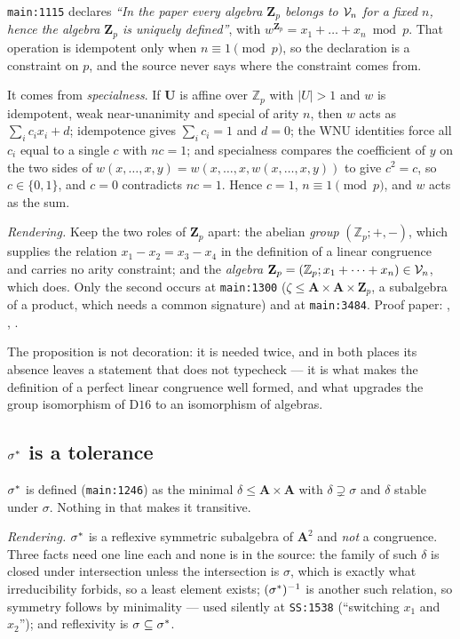 \texttt{main:1115} declares \emph{``In the paper every algebra $\mathbf Z_{p}$
belongs to $\mathcal V_{n}$ for a fixed $n$, hence the algebra $\mathbf Z_{p}$ is uniquely
defined''}, with $w^{\mathbf Z_{p}}=x_{1}+\dots+x_{n}\bmod p$. That operation is
idempotent only when $n\equiv1\pmod p$, so the declaration is a constraint on
$p$, and the source never says where the constraint comes from.

It comes from \emph{specialness}. If $\mathbf U$ is affine over $\mathbb Z_{p}$
with $|U|>1$ and $w$ is idempotent, weak near-unanimity and special of arity
$n$, then $w$ acts as $\sum_{i}c_{i}x_{i}+d$; idempotence gives
$\sum_{i}c_{i}=1$ and $d=0$; the WNU identities force all $c_{i}$ equal to a
single $c$ with $nc=1$; and specialness compares the coefficient of $y$ on the
two sides of $w(x,\dots,x,y)=w(x,\dots,x,w(x,\dots,x,y))$ to give $c^{2}=c$, so
$c\in\{0,1\}$, and $c=0$ contradicts $nc=1$. Hence $c=1$, $n\equiv1\pmod p$,
and $w$ acts as the sum.

\emph{Rendering.} Keep the two roles of $\mathbf Z_{p}$ apart: the abelian
\emph{group} $(\mathbb Z_{p};+,-)$, which supplies the relation
$x_{1}-x_{2}=x_{3}-x_{4}$ in the definition of a linear congruence and carries
no arity constraint; and the \emph{algebra}
$\mathbf Z_{p}=(\mathbb Z_{p};x_{1}+\dots+x_{n})\in\mathcal V_{n}$, which does. Only the
second occurs at \texttt{main:1300} ($\zeta\le\mathbf A\times\mathbf A\times
\mathbf Z_{p}$, a subalgebra of a product, which needs a common signature) and
at \texttt{main:3484}. Proof paper: ,
, .

The proposition is not decoration: it is needed twice, and in both places its
absence leaves a statement that does not typecheck --- it is what makes the
definition of a perfect linear congruence well formed, and what upgrades the
group isomorphism of $\mathrm D16$ to an isomorphism of algebras.

\subsection{$\sigma^{*}$ is a tolerance}\label{sec:leg-cover}

$\sigma^{*}$ is defined (\texttt{main:1246}) as the minimal
$\delta\le\mathbf A\times\mathbf A$ with $\delta\supsetneq\sigma$ and $\delta$
stable under $\sigma$. Nothing in that makes it transitive.

\emph{Rendering.} $\sigma^{*}$ is a reflexive symmetric subalgebra of
$\mathbf A^{2}$ and \emph{not} a congruence. Three facts need one line each and
none is in the source: the family of such $\delta$ is closed under
intersection unless the intersection is $\sigma$, which is exactly what
irreducibility forbids, so a least element exists; $(\sigma^{*})^{-1}$ is
another such relation, so symmetry follows by minimality --- used silently at
\texttt{SS:1538} (``switching $x_{1}$ and $x_{2}$''); and reflexivity is
$\sigma\subseteq\sigma^{*}$.

